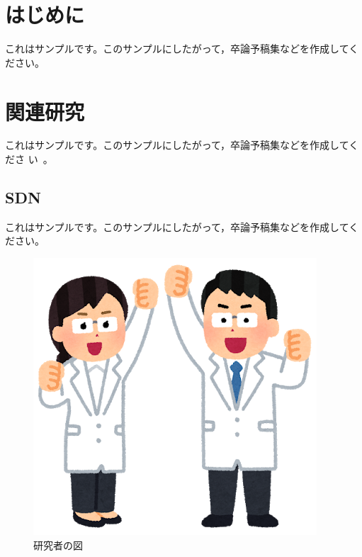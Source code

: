 \documentclass[a4paper,11pt,twocolumn]{jsarticle}
\begin{document}
\maketitle


 \section{はじめに}
 
 これはサンプルです。このサンプルにしたがって，卒論予稿集などを作成してください。
 
 \section{関連研究}

  これはサンプルです。このサンプルにしたがって，卒論予稿集などを作成してくださ
  い~\cite{sato19hoge-TPT}。
	
 \subsection{SDN}
 
 これはサンプルです。このサンプルにしたがって，卒論予稿集などを作成してください。
 
	\begin{figure}[htb]
	 \centering
	 \includegraphics[width=\columnwidth]{figure1.png}
	 \caption{研究者の図}
	 \label{fig:investigator}
	\end{figure}

	
	
\end{document}
